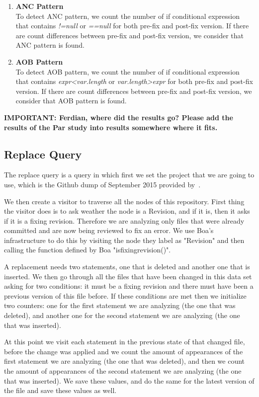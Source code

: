 \documentclass{sig-alternate-05-2015}
\newcommand{\todo}[1]
  {{\scriptsize \textbf{\color{red} {#1}}}}
\begin{document}
\begin{enumerate}
\item {\bf ANC Pattern}\\
  To detect ANC pattern, we count the number of if conditional expression that
  contains {\em !=null} or {\em ==null} for both pre-fix and post-fix
  version. If there are count differences between pre-fix and post-fix version,
  we consider that ANC pattern is found.
	
\item {\bf AOB Pattern}\\
  To detect AOB pattern, we count the number of if conditional expression that
  contains {\em expr<var.length} or {\em var.length>expr} for both pre-fix and
  post-fix version. If there are count differences between pre-fix and post-fix
  version, we consider that AOB pattern is found.
	
\end{enumerate}
\todo{IMPORTANT: Ferdian, where did the results go?  Please add the results of
  the Par study into results somewhere where it fits.}

\subsection{Replace Query}
The replace query is a query in which first we set the project that we are going
to use, which is the Github dump of September 2015 provided by~\cite{dyer2013}.

We then create a visitor to traverse all the nodes of this repository. First
thing the visitor does is to ask weather the node is a Revision, and if it is,
then it asks if it is a fixing revision. Therefore we are analyzing only files
that were already committed and are now being reviewed to fix an error. We use
Boa's infrastructure to do this by visiting the node they label as "Revision"
and then calling the function defined by Boa "isfixingrevision()".

A replacement needs two statements, one that is deleted and another one that is
inserted.  We then go through all the files that have been changed in this data
set asking for two conditions: it must be a fixing revision and there must have
been a previous version of this file before. If these conditions are met then we
initialize two counters: one for the first statement we are analyzing (the one
that was deleted), and another one for the second statement we are analyzing
(the one that was inserted).

At this point we visit each statement in the previous state of that changed
file, before the change was applied and we count the amount of appearances of
the first statement we are analyzing (the one that was deleted), and then we
count the amount of appearances of the second statement we are analyzing (the
one that was inserted). We save these values, and do the same for the latest
version of the file and save these values as well.
\end{document}
